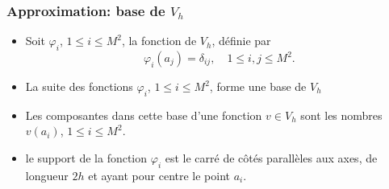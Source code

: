 \documentclass{beamer}
\begin{document}
\begin{frame}
\frametitle{Approximation: base de $V_h$}
\begin{itemize}
\item Soit $\varphi_i$, $1\leq i\leq M^2$, la fonction de $V_h$, définie par 
\begin{equation}
\varphi_i(a_j)=\delta_{ij},\quad 1\leq i,j \leq M^2.
\end{equation}
\item   La suite des fonctions $\varphi_i$, $1\leq i\leq M^2$, forme une base de $V_h$ 
\item Les composantes dans cette base d'une fonction $v\in V_h$ sont les nombres $v(a_i)$,  $1\leq i\leq M^2$.

 \item le support de la fonction $\varphi_i$ est le carré de côtés parallèles aux axes, de longueur $2h$ et ayant pour centre le point $a_i$.
 \begin{center}

\end{center}

\end{itemize}


\end{frame}
\end{document}
